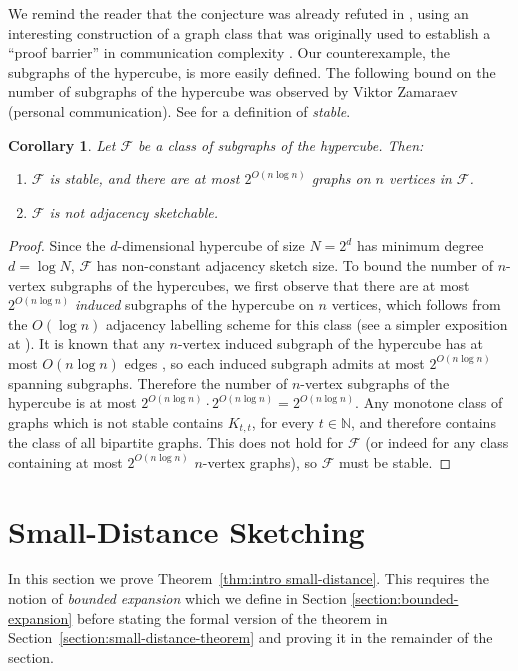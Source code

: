 \documentclass[11pt]{article}
\newtheorem{corollary}[thm]{Corollary}
\theoremstyle{definition}
\def\F {{\mathcal F}}
\def\bN{{\mathbb N}}
\begin{document}
\noindent
We remind the reader that the conjecture was already refuted in \cite{HHH21a}, using an interesting
construction of a graph class that was originally used to establish a ``proof barrier'' in
communication complexity \cite{HHH21b}. Our counterexample, the subgraphs of the hypercube, is more
easily defined. The following bound on the number of subgraphs of the hypercube was observed by
Viktor Zamaraev (personal communication). See \cite{HWZ21} for a definition of \emph{stable}.

\begin{corollary}
\label{cor:hypercube counterexample}
Let $\F$ be a class of subgraphs of the hypercube. Then:
\begin{enumerate}
\item $\F$ is stable, and there are at most $2^{O(n \log n)}$ graphs on $n$ vertices in $\F$.
\item $\F$ is not adjacency sketchable.
\end{enumerate}
\end{corollary}
\begin{proof}
Since the $d$-dimensional hypercube of size $N = 2^d$ has minimum degree $d = \log N$, $\F$ has
non-constant adjacency sketch size. To bound the number of $n$-vertex subgraphs of the hypercubes,
we first observe that there are at most $2^{O(n\log n)}$ \emph{induced} subgraphs of the hypercube
on $n$ vertices, which follows from the $O(\log n)$ adjacency labelling scheme for this class
\cite{Har20} (see a simpler exposition at \cite{Har22}).  It is known that any $n$-vertex induced
subgraph of the hypercube has at most $O(n \log n)$ edges \cite{Gra70}, so each induced subgraph
admits at most $2^{O(n\log n)}$ spanning subgraphs. Therefore the number of $n$-vertex subgraphs of
the hypercube is at most $2^{O(n \log n)} \cdot 2^{O(n \log n)} = 2^{O(n \log n)}$.  Any monotone
class of graphs which is not stable contains $K_{t,t}$, for every $t \in \bN$, and therefore
contains the class of all bipartite graphs.  This does not hold for $\F$ (or indeed for any class
containing at most $2^{O(n \log n)}$ $n$-vertex graphs), so $\F$ must be stable.
\end{proof}

\section{Small-Distance Sketching}
\label{section:small-distance}

In this section we prove Theorem~\ref{thm:intro small-distance}. This requires the notion of
\emph{bounded expansion} which we define in Section \ref{section:bounded-expansion} before stating
the formal version of the theorem in Section~\ref{section:small-distance-theorem} and proving it in
the remainder of the section.
\end{document}
